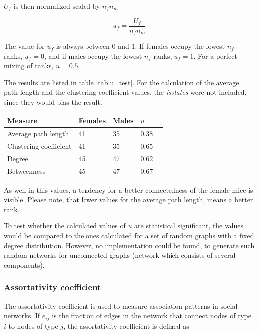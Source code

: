 $U_f$ is then normalized scaled by $n_fn_m$

\begin{equation}
u_f = \frac{U_f}{n_fn_m}
\label{eq:mann_w_norm}
\end{equation}
 
The value for $u_f$ is always between 0 and 1. If females occupy the lowest $n_f$ ranks,  $u_f = 0$, and if males occupy the lowest $n_f$ ranks, $u_f=1$. For a perfect mixing of ranks, $u=0.5$.

The results are listed in table \ref{tab:u_test}. For the calculation of the average path length and the clustering coefficient values, the \textit{isolates} were not included, since they would bias the result.

\begin{center} 
\renewcommand\arraystretch{1.2}
\begin{tabular}{lllll}
\toprule
\textbf{Measure} &	\textbf{Females}	& \textbf{Males}	& \textbf{$u$} \\\midrule
Average path length	&	41	&	35	& $0.38$\\
Clustering coefficient	&	41	&	35	&  $0.65$ \\
Degree	&	45 	& 	47 	& $0.62$	\\
Betweenness	&	45	&	47	&	$0.67$ \\\bottomrule

\end{tabular}
\label{tab:u_test}
\end{center}

As well in this values, a tendency for a better connectedness of the female mice is visible. Please note, that lower values for the average path length, means a better rank.

To test whether the calculated values of $u$ are statistical significant, the values would be compared to the ones calculated for a set of random graphs with a fixed degree distribution\cite{croft:07}\cite{newman:02a}. However, no implementation could be found, to generate such random networks for unconnected graphs (network which consists of  several components).

\subsubsection{Assortativity coefficient}
\label{subsubsec:assortivity}     

The assortativity coefficient\cite{newman:03} is used to measure association patterns in social networks. If $e_{ij}$ is the fraction of edges in the network that connect nodes of type $i$ to nodes of type $j$, the assortativity coefficient is defined as

